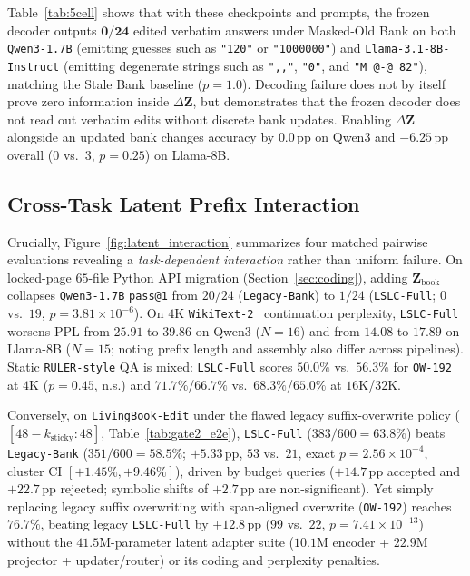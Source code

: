 \documentclass[10pt]{article}
\newcommand{\vect}[1]{\mathbf{#1}}
\newcommand{\pp}{\,\text{pp}}
\renewcommand{\_}{\origunderscore\allowbreak}
\begin{document}
Table~\ref{tab:5cell} shows that with these checkpoints and prompts, the frozen decoder outputs $\mathbf{0/24}$ edited verbatim answers under Masked-Old Bank on both \texttt{Qwen3-1.7B} (emitting guesses such as \texttt{"120"} or \texttt{"1000000"}) and \texttt{Llama-3.1-8B-Instruct} (emitting degenerate strings such as \texttt{",,"}, \texttt{"0"}, and \texttt{"M @-@ 82"}), matching the Stale Bank baseline ($p=1.0$). Decoding failure does not by itself prove zero information inside $\Delta\vect{Z}$, but demonstrates that the frozen decoder does not read out verbatim edits without discrete bank updates. Enabling $\Delta\vect{Z}$ alongside an updated bank changes accuracy by $0.0\pp$ on Qwen3 and $-6.25\pp$ overall ($0$ vs.\ $3$, $p=0.25$) on Llama-8B.

\subsection{Cross-Task Latent Prefix Interaction}
Crucially, Figure~\ref{fig:latent_interaction} summarizes four matched pairwise evaluations revealing a \emph{task-dependent interaction} rather than uniform failure. On locked-page $65$-file Python API migration (Section~\ref{sec:coding}), adding $\vect{Z}_{\text{book}}$ collapses \texttt{Qwen3-1.7B} \texttt{pass@1} from $20/24$ (\texttt{Legacy-Bank}) to $1/24$ (\texttt{LSLC-Full}; $0$ vs.\ $19$, $p=3.81\times 10^{-6}$). On $4\text{K}$ \texttt{WikiText-2}~\citep{merity2017wikitext} continuation perplexity, \texttt{LSLC-Full} worsens PPL from $25.91$ to $39.86$ on Qwen3 ($N=16$) and from $14.08$ to $17.89$ on Llama-8B ($N=15$; noting prefix length and assembly also differ across pipelines). Static \texttt{RULER-style} QA is mixed: \texttt{LSLC-Full} scores $50.0\%$ vs.\ $56.3\%$ for \texttt{OW-192} at $4\text{K}$ ($p=0.45$, n.s.) and $71.7\%$/$66.7\%$ vs.\ $68.3\%$/$65.0\%$ at $16\text{K}$/$32\text{K}$.

Conversely, on \texttt{LivingBook-Edit} under the flawed legacy suffix-overwrite policy ($[48-k_{\text{sticky}}:48]$, Table~\ref{tab:gate2_e2e}), \texttt{LSLC-Full} ($383/600 = 63.8\%$) beats \texttt{Legacy-Bank} ($351/600 = 58.5\%$; $+5.33\pp$, $53$ vs.\ $21$, exact $p=2.56\times 10^{-4}$, cluster CI $[+1.45\%, +9.46\%]$), driven by budget queries ($+14.7\pp$ accepted and $+22.7\pp$ rejected; symbolic shifts of $+2.7\pp$ are non-significant). Yet simply replacing legacy suffix overwriting with span-aligned overwrite (\texttt{OW-192}) reaches $76.7\%$, beating legacy \texttt{LSLC-Full} by $+12.8\pp$ ($99$ vs.\ $22$, $p=7.41\times 10^{-13}$) without the $41.5\text{M}$-parameter latent adapter suite ($10.1\text{M}$ encoder + $22.9\text{M}$ projector + updater/router) or its coding and perplexity penalties.
\end{document}
